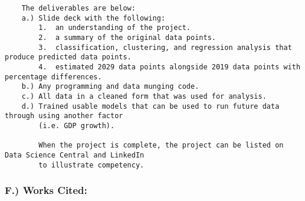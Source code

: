 \documentclass[]{article}
\begin{document}
\begin{verbatim}
    The deliverables are below:
    a.) Slide deck with the following:
        1.  an understanding of the project.
        2.  a summary of the original data points.
        3.  classification, clustering, and regression analysis that produce predicted data points.
        4.  estimated 2029 data points alongside 2019 data points with percentage differences.
    b.) Any programming and data munging code.
    c.) All data in a cleaned form that was used for analysis. 
    d.) Trained usable models that can be used to run future data through using another factor 
        (i.e. GDP growth).

        When the project is complete, the project can be listed on Data Science Central and LinkedIn 
        to illustrate competency.
\end{verbatim}

\subsubsection{F.) Works Cited:}\label{f.-works-cited}
\end{document}
